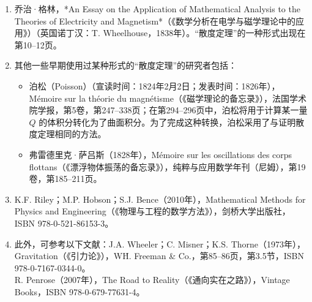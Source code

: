 \begin{enumerate}
\item 乔治·格林，*An Essay on the Application of Mathematical Analysis to the Theories of Electricity and Magnetism*（《数学分析在电学与磁学理论中的应用》）（英国诺丁汉：T. Wheelhouse，1838年）。“散度定理”的一种形式出现在第10–12页。
\item 其他一些早期使用过某种形式的“散度定理”的研究者包括：
\begin{itemize}
\item 泊松（Poisson）（宣读时间：1824年2月2日；发表时间：1826年），Mémoire sur la théorie du magnétisme（《磁学理论的备忘录》），法国学术院学报，第5卷，第247–338页；在第294–296页中，泊松将用于计算某一量 $Q$ 的体积分转化为了曲面积分。为了完成这种转换，泊松采用了与证明散度定理相同的方法。
\item 弗雷德里克·萨吕斯（1828年），Mémoire sur les oscillations des corps flottans（《漂浮物体振荡的备忘录》），纯粹与应用数学年刊（尼姆），第19卷，第185–211页。
\end{itemize}
\item K.F. Riley；M.P. Hobson；S.J. Bence（2010年），Mathematical Methods for Physics and Engineering（《物理与工程的数学方法》），剑桥大学出版社，ISBN 978-0-521-86153-3。
\item 此外，可参考以下文献：J.A. Wheeler；C. Misner；K.S. Thorne（1973年），Gravitation（《引力论》），W\.H. Freeman & Co.，第85–86页，第3.5节，ISBN 978-0-7167-0344-0。\\
R. Penrose（2007年），The Road to Reality（《通向实在之路》），Vintage Books，ISBN 978-0-679-77631-4。
\end{enumerate}